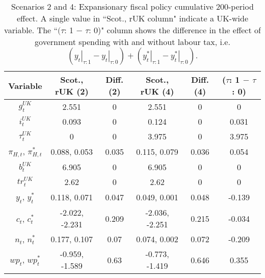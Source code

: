 \begin{table}[H]
\centering
\begin{tabular}{cccccc}
  \hline
{\textbf{Variable}} & {\textbf{Scot., rUK (2)}} & {\textbf{Diff. (2)}} & {\textbf{Scot., rUK (4)}} & {\textbf{Diff. (4)}} & {\textbf{($\tau$: 1 $-$ $\tau$: 0)}} \\ 
  \hline
${g^{UK}_t}$ & 2.551 & 0 & 2.551 & 0 & 0 \\ 
  ${i^{UK}_t}$ & 0.093 & 0 & 0.124 & 0 & 0.031 \\ 
  ${\tau^{UK}_t}$ & 0 & 0 & 3.975 & 0 & 3.975 \\ 
  ${\pi_{H,t}}$, ${\pi^*_{H,t}}$ & 0.088, 0.053 & 0.035 & 0.115, 0.079 & 0.036 & 0.054 \\ 
  ${b^{UK}_t}$ & 6.905 & 0 & 6.905 & 0 & 0 \\ 
  ${tr^{UK}_t}$ & 2.62 & 0 & 2.62 & 0 & 0 \\ 
  ${y_t}$, ${y^*_t}$ & 0.118, 0.071 & 0.047 & 0.049, 0.001 & 0.048 & -0.139 \\ 
  ${c_t}$, ${c^*_t}$ & -2.022, -2.231 & 0.209 & -2.036, -2.251 & 0.215 & -0.034 \\ 
  ${n_t}$, ${n^*_t}$ & 0.177, 0.107 & 0.07 & 0.074, 0.002 & 0.072 & -0.209 \\ 
  ${wp_t}$, ${wp^*_t}$ & -0.959, -1.589 & 0.63 & -0.773, -1.419 & 0.646 & 0.355 \\ 
   \hline
\end{tabular}
\caption{Scenarios 2 and 4: Expansionary fiscal policy cumulative 200-period effect. A single value in ``Scot., rUK column" indicate a UK-wide variable. The ``$(\tau$: 1 $-$ $\tau$: 0)" column shows the difference in the effect of government spending with and without labour tax, i.e. $(\left. y_t \right|_{\tau:1} - \left. y_t \right|_{\tau:0}) + (\left. y^*_t \right|_{\tau:1} - \left. y^*_t \right|_{\tau:0})$.} 
\label{table:responses_two_four}
\end{table}
